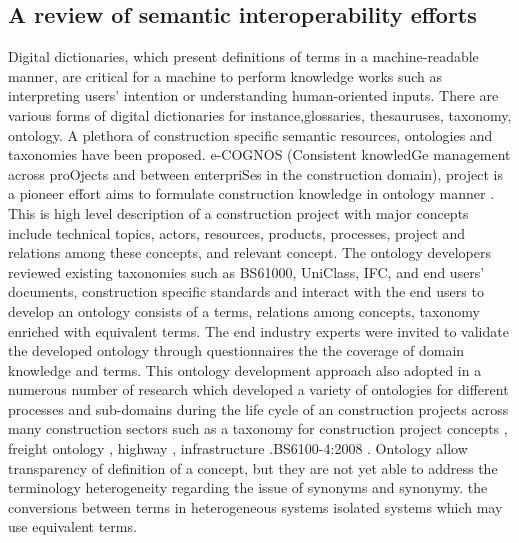\documentclass[Journal,InsideFigs, DoubleSpace]{ascelike} %
\begin{document}
\subsection{A review of semantic interoperability efforts}
%
Digital dictionaries, which present definitions of terms in a machine-readable manner, are critical for a machine to perform knowledge works such as interpreting users' intention or understanding human-oriented inputs. There are various forms of digital dictionaries for instance,glossaries, thesauruses, taxonomy, ontology. A plethora of construction specific semantic resources, ontologies and taxonomies have been proposed. e-COGNOS (Consistent knowledGe management across proOjects and between enterpriSes in the construction domain), project is a pioneer effort aims to formulate construction knowledge in ontology manner \cite{wetherill02, lima05}. This is high level description of a construction project with major concepts include technical topics, actors, resources, products, processes, project and relations among these concepts, and relevant concept. The ontology developers reviewed existing taxonomies such as BS61000, UniClass, IFC, and end users' documents, construction specific standards and interact with the end users to develop an ontology consists of a terms, relations among concepts, taxonomy enriched with equivalent terms. The end industry experts were invited to validate the developed ontology through questionnaires the the coverage of domain knowledge and terms. This ontology development approach also adopted in a numerous number of research which developed a variety of ontologies for different processes and sub-domains during the life cycle of an construction projects across many construction sectors such as a taxonomy for construction project concepts \cite{el-diraby05b}, freight ontology \cite{seedah15}, highway \cite{el-diraby05}, infrastructure \cite{osman06}.BS6100-4:2008 \cite{bs6100-08}. Ontology allow transparency of definition of a concept, but they are not yet able to address the terminology heterogeneity regarding the issue of synonyms and synonymy. the conversions between terms in heterogeneous systems isolated systems which may use equivalent terms. 
\par
\end{document}
